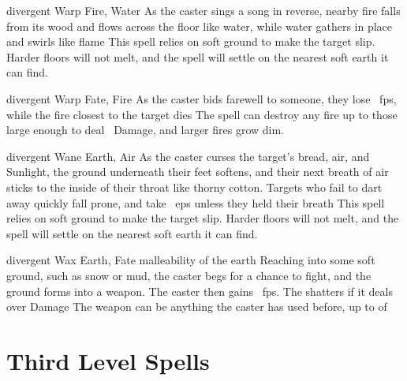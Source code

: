\begin{multicols}{2}
  {divergent}%
  {Warp}%
  {Fire, Water}%
  {}%
  {As the caster sings a song in reverse, nearby fire falls from its wood and flows across the floor like water, while water gathers in place and swirls like flame}%
  {
  This spell relies on soft ground to make the target slip.
  Harder floors will not melt, and the spell will settle on the nearest soft earth it can find.}

  {divergent}%
  {Warp}%
  {Fate, Fire}%
  {}%
  {As the caster bids farewell to someone, they lose \showDam~\glspl{fp}, while the fire closest to the target dies}%
  {
  The spell can destroy any fire up to those large enough to deal \showDam\ Damage, and larger fires grow dim.}

  {divergent}%
  {Wane}%
  {Earth, Air}%
  {}%
  {As the caster curses the target's bread, air, and Sunlight, the ground underneath their feet softens, and their next breath of air sticks to the inside of their throat like thorny cotton.
  Targets who fail to dart away quickly fall prone, and take ~\glspl{ep} unless they held their breath}%
  {
  This spell relies on soft ground to make the target slip.
  Harder floors will not melt, and the spell will settle on the nearest soft earth it can find.}

  {divergent}%
  {Wax}%
  {Earth, Fate}%
  {malleability of the earth}%
  {Reaching into some soft ground, such as snow or mud, the caster begs for a chance to fight, and the ground forms into a weapon.
  The caster then gains ~\glspl{fp}.
  The shatters if it deals over  Damage}%
  {
  The weapon can be anything the caster has used before, up to  of }

\end{multicols}

\section{Third Level Spells}

